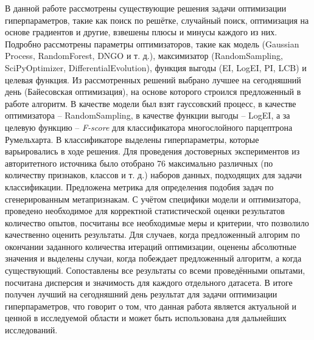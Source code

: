 \documentclass[times,specification,annotation]{itmo-student-thesis}
\begin{document}
	
	\startconclusionpage
	В данной работе рассмотрены существующие решения задачи оптимизации гиперпараметров, такие как поиск по решётке, случайный поиск, оптимизация на основе градиентов и другие, взвешены плюсы и минусы каждого из них. Подробно рассмотрены параметры оптимизаторов, такие как модель (Gaussian Process, RandomForest, DNGO и т. д.), максимизатор (RandomSampling, SciPyOptimizer, DifferentialEvolution), функция выгоды (EI, LogEI, PI, LCB) и целевая функция. Из рассмотренных решений выбрано лучшее на сегодняшний день (Байесовская оптимизация), на основе которого строился предложенный в работе алгоритм. В качестве модели был взят гауссовский процесс, в качестве оптимизатора -- RandomSampling, в качестве функции выгоды -- LogEI, а за целевую функцию -- \textit{F-score} для классификатора многослойного парцептрона Румельхарта. В классификаторе выделены гиперпараметры, которые варьировались в ходе решения. Для проведения достоверных экспериментов из авторитетного источника было отобрано 76 максимально различных (по количеству признаков, классов и т. д.) наборов данных, подходящих для задачи классификации. Предложена метрика для определения подобия задач по сгенерированным метапризнакам. С учётом специфики модели и оптимизатора, проведено необходимое для корректной статистической оценки результатов количество опытов, посчитаны все необходимые меры и критерии, что позволило качественно оценить результаты. Для случаев, когда предложенный алгорим по окончании заданного количества итераций оптимизации, оценены абсолютные значения и выделены случаи, когда побеждает предложенный алгоритм, а когда существующий. Сопоставлены все результаты со всеми проведёнными опытами, посчитана дисперсия и значимость для каждого отдельного датасета. В итоге получен лучший на сегодняшний день результат для задачи оптимизации гиперпараметров, что говорит о том, что данная работа является актуальной и ценной в исследуемой области и может быть использована для дальнейших исследований. 
	
	\printmainbibliography
	
	
	\appendix
\end{document}
